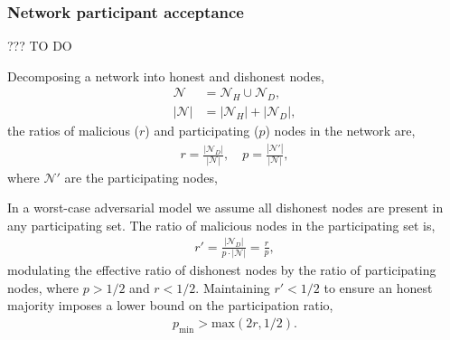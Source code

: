 \documentclass[twocolumn, aps, amsmath, amssymb, nofootinbib, superscriptaddress, longbibliography, floatfix, eqsecnum, rmp]{revtex4-2}
\begin{document}
%
%

\subsubsection{Network participant acceptance}

??? TO DO

Decomposing a network into honest and dishonest nodes,
\begin{align}
	\mathcal{N} &= \mathcal{N}_H \cup \mathcal{N}_D,\nonumber\\
		|\mathcal{N}| &= |\mathcal{N}_H| + |\mathcal{N}_D|,
\end{align}
the ratios of malicious ($r$) and participating ($p$) nodes in the network are,
\begin{align}
	r = \frac{|\mathcal{N}_D|}{|\mathcal{N}|},\quad p = \frac{|\mathcal{N}'|}{|\mathcal{N}|},
\end{align}
where $\mathcal{N}'$ are the participating nodes,

In a worst-case adversarial model we assume all dishonest nodes are present in any participating set. The ratio of malicious nodes in the participating set is,
\begin{align}
	r' = \frac{|\mathcal{N}_D|}{p\cdot|\mathcal{N}|} = \frac{r}{p},
\end{align}
modulating the effective ratio of dishonest nodes by the ratio of participating nodes, where \mbox{$p>1/2$} and \mbox{$r<1/2$}. Maintaining \mbox{$r'<1/2$} to ensure an honest majority imposes a lower bound on the participation ratio,
\begin{align}
	p_\mathrm{min} > \mathrm{max}(2r,1/2).
\end{align}
\end{document}
